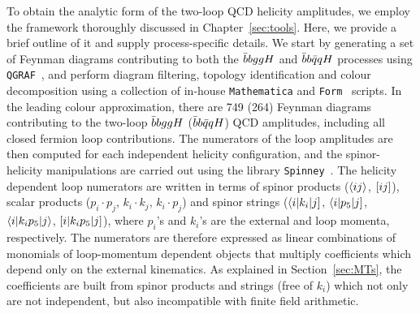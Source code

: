 \documentclass[main.tex]{subfiles}
\begin{document}
To obtain the analytic form of the two-loop QCD helicity amplitudes, we employ the framework thoroughly discussed in Chapter~\ref{sec:tools}. Here, we provide a brief outline of it and supply process-specific details. We start by generating a set of Feynman diagrams contributing to 
both the $\bar{b}bggH$ and $\bar{b}b\bar{q}qH$ processes using \texttt{QGRAF}~\cite{Nogueira:1991ex}, and perform diagram filtering, topology identification and colour decomposition using a collection of in-house \texttt{Mathematica} and \texttt{Form}~\cite{Kuipers:2012rf,Ruijl:2017dtg} scripts.  In the leading colour approximation, there are 749 (264) Feynman diagrams contributing to the two-loop $\bar{b}bggH$ ($\bar{b}b\bar{q}qH$) QCD amplitudes, including all closed fermion loop contributions. The numerators of the loop amplitudes are then computed for each independent helicity configuration, and the spinor-helicity manipulations are carried out using the library \texttt{Spinney}~\cite{Cullen:2010jv}. The helicity dependent loop numerators are written in terms of spinor products ($\langle ij\rangle$, $[ij]$), scalar products ($p_i\cdot p_j$, $k_i\cdot k_j$, $k_i \cdot p_j$) and spinor strings ($\langle i|k_i|j]$, $\langle i|p_5|j]$, $\langle i|k_i p_5|j\rangle$, $[i|k_i p_5|j]$), where $p_i$'s and $k_i$'s are the external and loop momenta, respectively. The numerators are therefore expressed as linear combinations of monomials of loop-momentum dependent objects that multiply coefficients which depend only on the external kinematics.
As explained in Section~\ref{sec:MTs}, the coefficients are built from spinor products and strings (free of $k_i$) which not only are not independent, but also incompatible with finite field arithmetic.
\end{document}
